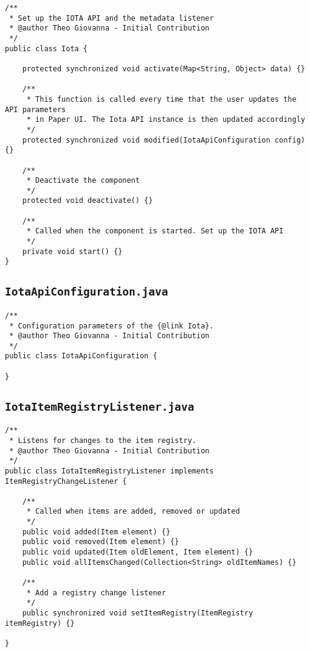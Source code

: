 \documentclass[a4paper,10pt]{article}
\begin{document}
\begin{verbatim}
/**
 * Set up the IOTA API and the metadata listener
 * @author Theo Giovanna - Initial Contribution
 */
public class Iota {
	
    protected synchronized void activate(Map<String, Object> data) {}
    
    /**
     * This function is called every time that the user updates the API parameters
     * in Paper UI. The Iota API instance is then updated accordingly
     */
    protected synchronized void modified(IotaApiConfiguration config) {}
    
    /**
     * Deactivate the component
     */
    protected void deactivate() {}
    
    /**
     * Called when the component is started. Set up the IOTA API
     */
    private void start() {}
}
\end{verbatim}


\subsection{\texttt{IotaApiConfiguration.java}}

\begin{verbatim}
/**
 * Configuration parameters of the {@link Iota}.
 * @author Theo Giovanna - Initial Contribution
 */
public class IotaApiConfiguration {

}
\end{verbatim}

\subsection{\texttt{IotaItemRegistryListener.java}}

\begin{verbatim}
/**
 * Listens for changes to the item registry.
 * @author Theo Giovanna - Initial Contribution
 */
public class IotaItemRegistryListener implements ItemRegistryChangeListener {

	/**
	 * Called when items are added, removed or updated
	 */ 
	public void added(Item element) {}
	public void removed(Item element) {}
	public void updated(Item oldElement, Item element) {}
	public void allItemsChanged(Collection<String> oldItemNames) {}

	/**
	 * Add a registry change listener
	 */
	public synchronized void setItemRegistry(ItemRegistry itemRegistry) {}

}
\end{verbatim}
\end{document}
